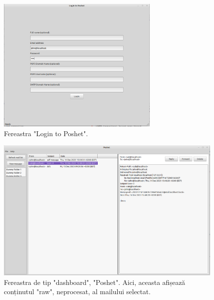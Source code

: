 \documentclass[runningheads]{llncs}
\begin{document}
\begin{figure}
    \centering
    \includegraphics[width={300px}]{poshetLogin.png}
    \caption{Fereastra "Login to Poshet".}
    \label{fig:poshetlogin}
\end{figure}

\begin{figure}
    \centering
    \includegraphics[width=\textwidth]{poshetDashboard.png}
    \caption{Fereastra de tip "dashboard", "Poshet". Aici, aceasta afișează conținutul "raw", neprocesat, al mailului selectat.}
    \label{fig:poshetDashboard}
\end{figure}

\newpage
\end{document}
